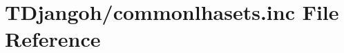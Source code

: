 \hypertarget{commonlhasets_8inc}{\section{T\+Djangoh/commonlhasets.inc File Reference}
\label{commonlhasets_8inc}
}
